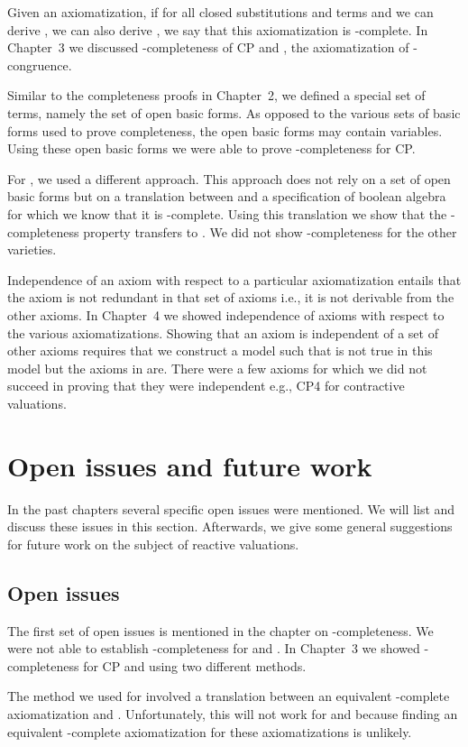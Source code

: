 \documentclass[a4paper,twoside,openright]{report}
\begin{document}
Given an axiomatization, if for all closed substitutions  and terms  and  we can derive , we can also derive , we say that this axiomatization is -complete. In Chapter~3 we discussed -completeness of CP and , the axiomatization of -congruence.

Similar to the completeness proofs in Chapter~2, we defined a special set of terms, namely the set of open basic forms. As opposed to the various sets of basic forms used to prove completeness, the open basic forms may contain variables. Using these open basic forms we were able to prove -completeness for CP.

For , we used a different approach. This approach does not rely on a set of open basic forms but on a translation between  and a specification of boolean algebra for which we know that it is -complete. Using this translation we show that the -completeness property transfers to . We did not show -completeness for the other varieties.

Independence of an axiom with respect to a particular axiomatization entails that the axiom is not redundant in that set of axioms i.e., it is not derivable from the other axioms. In Chapter~4 we showed independence of axioms with respect to the various axiomatizations. Showing that an axiom  is independent of a set  of other axioms requires that we construct a model such that  is not true in this model but the axioms in  are. There were a few axioms for which we did not succeed in proving that they were independent e.g., CP4 for contractive valuations.

\section{Open issues and future work}
In the past chapters several specific open issues were mentioned. We will list and discuss these issues in this section. Afterwards, we give some general suggestions for future work on the subject of reactive valuations.

\subsection{Open issues}

The first set of open issues is mentioned in the chapter on -completeness. We were not able to establish -completeness for  and . In Chapter~3 we showed -completeness for CP and  using two different methods.

The method we used for  involved a translation between an equivalent -complete axiomatization and . Unfortunately, this will not work for  and  because finding an equivalent -complete axiomatization for these axiomatizations is unlikely.
\end{document}
